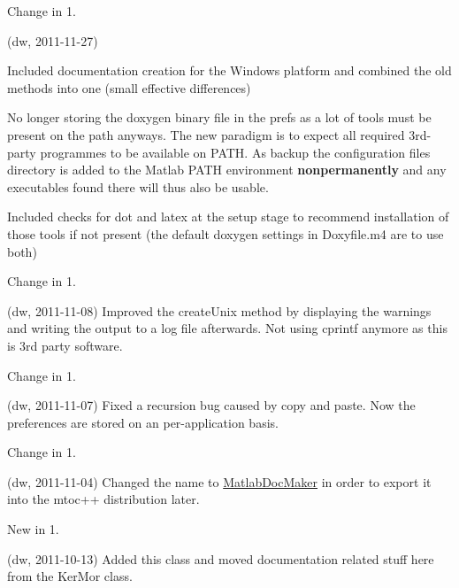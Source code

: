 \begin{DoxyRefDesc}{Change in 1.}
\item[\hyperlink{changelog1_2__changelog1_2000001}{Change in 1.\+2}](dw, 2011-\/11-\/27)
\begin{DoxyItemize}
\item Included documentation creation for the Windows platform and combined the old methods into one (small effective differences)
\item No longer storing the doxygen binary file in the prefs as a lot of tools must be present on the path anyways. The new paradigm is to expect all required 3rd-\/party programmes to be available on P\+A\+TH. As backup the configuration files directory is added to the Matlab P\+A\+TH environment {\bfseries nonpermanently} and any executables found there will thus also be usable.
\item Included checks for {\ttfamily dot} and {\ttfamily latex} at the setup stage to recommend installation of those tools if not present (the default doxygen settings in Doxyfile.\+m4 are to use both)
\end{DoxyItemize}\end{DoxyRefDesc}


\begin{DoxyRefDesc}{Change in 1.}
\item[\hyperlink{changelog1_2__changelog1_2000002}{Change in 1.\+2}](dw, 2011-\/11-\/08) Improved the create\+Unix method by displaying the warnings and writing the output to a log file afterwards. Not using cprintf anymore as this is 3rd party software.\end{DoxyRefDesc}


\begin{DoxyRefDesc}{Change in 1.}
\item[\hyperlink{changelog1_2__changelog1_2000003}{Change in 1.\+2}](dw, 2011-\/11-\/07) Fixed a recursion bug caused by copy and paste. Now the preferences are stored on an per-\/application basis.\end{DoxyRefDesc}


\begin{DoxyRefDesc}{Change in 1.}
\item[\hyperlink{changelog1_2__changelog1_2000004}{Change in 1.\+2}](dw, 2011-\/11-\/04) Changed the name to \hyperlink{class_matlab_doc_maker}{Matlab\+Doc\+Maker} in order to export it into the mtoc++ distribution later.\end{DoxyRefDesc}


\begin{DoxyRefDesc}{New in 1.}
\item[\hyperlink{newfeat1_2__newfeat1_2000001}{New in 1.\+2}](dw, 2011-\/10-\/13) Added this class and moved documentation related stuff here from the Ker\+Mor class.\end{DoxyRefDesc}


